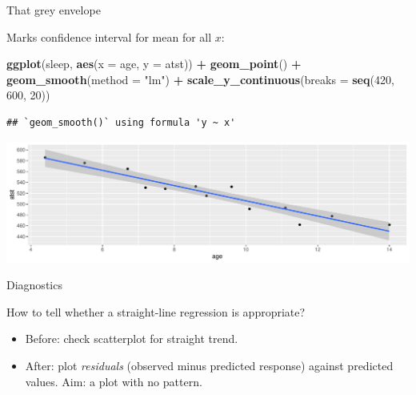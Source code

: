 \documentclass[
  ignorenonframetext,
]{beamer}
\newenvironment{Shaded}{\begin{snugshade}}{\end{snugshade}}
\newcommand{\DataTypeTok}[1]{\textcolor[rgb]{0.13,0.29,0.53}{#1}}
\newcommand{\DecValTok}[1]{\textcolor[rgb]{0.00,0.00,0.81}{#1}}
\newcommand{\KeywordTok}[1]{\textcolor[rgb]{0.13,0.29,0.53}{\textbf{#1}}}
\newcommand{\NormalTok}[1]{#1}
\newcommand{\OperatorTok}[1]{\textcolor[rgb]{0.81,0.36,0.00}{\textbf{#1}}}
\newcommand{\StringTok}[1]{\textcolor[rgb]{0.31,0.60,0.02}{#1}}
\begin{document}
\begin{frame}[fragile]{That grey envelope}
\protect\hypertarget{that-grey-envelope}{}

Marks confidence interval for mean for all \(x\):

\begin{Shaded}
\begin{Highlighting}[]
\KeywordTok{ggplot}\NormalTok{(sleep, }\KeywordTok{aes}\NormalTok{(}\DataTypeTok{x =}\NormalTok{ age, }\DataTypeTok{y =}\NormalTok{ atst)) }\OperatorTok{+}\StringTok{ }\KeywordTok{geom_point}\NormalTok{() }\OperatorTok{+}
\StringTok{  }\KeywordTok{geom_smooth}\NormalTok{(}\DataTypeTok{method =} \StringTok{"lm"}\NormalTok{) }\OperatorTok{+}
\StringTok{  }\KeywordTok{scale_y_continuous}\NormalTok{(}\DataTypeTok{breaks =} \KeywordTok{seq}\NormalTok{(}\DecValTok{420}\NormalTok{, }\DecValTok{600}\NormalTok{, }\DecValTok{20}\NormalTok{))}
\end{Highlighting}
\end{Shaded}

\begin{verbatim}
## `geom_smooth()` using formula 'y ~ x'
\end{verbatim}

\includegraphics{slides_d29_files/figure-beamer/unnamed-chunk-41-1.pdf}

\end{frame}

\begin{frame}{Diagnostics}
\protect\hypertarget{diagnostics}{}

How to tell whether a straight-line regression is appropriate?

\vspace{3ex}

\begin{itemize}
\item
  Before: check scatterplot for straight trend.
\item
  After: plot \emph{residuals} (observed minus predicted response)
  against predicted values. Aim: a plot with no pattern.
\end{itemize}

\end{frame}
\end{document}
